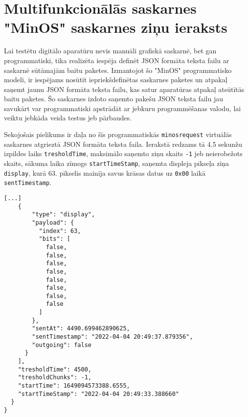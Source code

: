 \section{Multifunkcionālās saskarnes "MinOS" saskarnes ziņu ieraksts}
\label{att:minosrequest}

Lai testētu digitālo aparatūru nevis manuāli grafiskā saskarnē, bet gan
programmatiski, tika realizēta iespēja definēt JSON formāta teksta failu ar
saskarnē sūtāmajām baitu paketes. Izmantojot šo "MinOS" programmatisko modeli,
ir iespējams nosūtīt iepriekšdefinētas saskarnes paketes un atpakaļ saņemt jaunu
JSON formāta teksta failu, kas satur aparatūras atpakaļ atsūtītās baitu paketes.
Šo saskarnes izdoto saņemto pakešu JSON teksta failu jau savukārt var
programmatiski apstrādāt ar jebkuru programmēšanas valodu, lai veiktu jebkāda
veida testus jeb pārbaudes.

Sekojošais pielikums ir daļa no šīs programmatiskās \lstinline!minosrequest!
virtuālās saskarnes atgrieztā JSON formāta teksta faila. Ierakstā redzams tā 4.5
sekunžu izpildes laiks \lstinline!tresholdTime!, maksimālo saņemto ziņu skaits
\lstinline!-1! jeb neierobežots skaits, sākuma laika zīmogs
\lstinline!startTimeStamp!, saņemta displeja pikseļa ziņa \lstinline!display!,
kurā 63. pikselis mainīja savus krāsas datus uz \lstinline!0x00! laikā
\lstinline!sentTimestamp!.

\begin{lstlisting}[caption={\lstinline!minosrequest! programmaparatūras ziņu ieraksts JSON formātā},label={lst:buttonleds},captionpos=b]
    [...]
    {
        "type": "display",
        "payload": {
          "index": 63,
          "bits": [
            false,
            false,
            false,
            false,
            false,
            false,
            false,
            false
          ]
        },
        "sentAt": 4490.699462890625,
        "sentTimestamp": "2022-04-04 20:49:37.879356",
        "outgoing": false
      }
    ],
    "tresholdTime": 4500,
    "tresholdChunks": -1,
    "startTime": 1649094573388.6555,
    "startTimeStamp": "2022-04-04 20:49:33.388660"
  }
}
\end{lstlisting}
